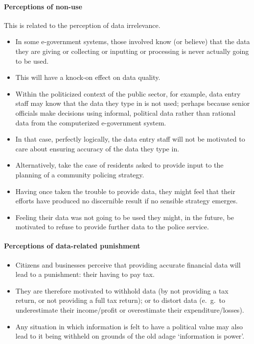 \paragraph*{Perceptions of non-use}
This is related to the perception of data irrelevance. 

\begin{itemize}
	\item In some e-government systems, those involved know (or believe) that the data they are giving or collecting or inputting or processing is never actually going to be
	used. 
	\item This will have a knock-on effect on data quality.
	\item Within the politicized context of the public sector, for example, data entry staff may know that the data they type in is not	used; perhaps because senior officials make decisions using informal, political data rather than rational data from the computerized e-government system. 
	\item In that case, perfectly logically, the data entry staff will not be motivated to care about ensuring accuracy of the data they type in. 
	\item Alternatively, take the case of residents asked to provide input to the planning of a community policing strategy.
	\item Having once taken the trouble to provide data, they might feel that their efforts have produced no discernible result if no sensible strategy emerges. 
	\item Feeling their data was not going to be used they might, in the future, be motivated to refuse to provide further data to the police service.
\end{itemize}



\paragraph*{Perceptions of data-related punishment}

\begin{itemize}
	\item Citizens and businesses perceive that providing accurate financial data will lead to a punishment: their having to pay tax. 
	\item They are therefore motivated to withhold data (by	not providing a tax return, or not providing a full tax return); or to distort data (e.\ g.\ to	underestimate their income/profit or overestimate their expenditure/losses). 
	\item Any situation in which information is felt to have a political value may also lead to it being withheld on grounds of the old adage `information is power'.
\end{itemize}


